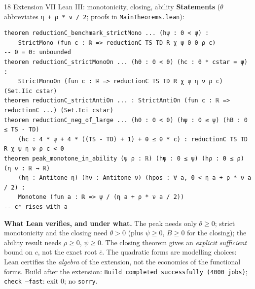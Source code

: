 \documentclass[aspectratio=169,11pt]{beamer}
\begin{document}
\begin{frame}[fragile]{18 \textperiodcentered{} Extension VII \textperiodcentered{} Lean III: monotonicity, closing, ability}
  \small\textbf{Statements} ($\theta$ abbreviates \texttt{η + ρ * ν / 2}; proofs in \texttt{MainTheorems.lean}):
\begin{lstlisting}
theorem reductionC_benchmark_strictMono ... (hψ : 0 < ψ) :
    StrictMono (fun c : ℝ => reductionC TS TD R χ ψ 0 0 ρ c)          -- θ = 0: unbounded
theorem reductionC_strictMonoOn ... (hθ : 0 < θ) (hc : θ * cstar = ψ) :
    StrictMonoOn (fun c : ℝ => reductionC TS TD R χ ψ η ν ρ c) (Set.Iic cstar)
theorem reductionC_strictAntiOn ... : StrictAntiOn (fun c : ℝ => reductionC ...) (Set.Ici cstar)
theorem reductionC_neg_of_large ... (hθ : 0 < θ) (hψ : 0 ≤ ψ) (hB : 0 ≤ TS - TD)
    (hc : 4 * ψ + 4 * ((TS - TD) + 1) + θ ≤ θ * c) : reductionC TS TD R χ ψ η ν ρ c < 0
theorem peak_monotone_in_ability (ψ ρ : ℝ) (hψ : 0 ≤ ψ) (hρ : 0 ≤ ρ) (η ν : ℝ → ℝ)
    (hη : Antitone η) (hν : Antitone ν) (hpos : ∀ a, 0 < η a + ρ * ν a / 2) :
    Monotone (fun a : ℝ => ψ / (η a + ρ * ν a / 2))                    -- c* rises with a
\end{lstlisting}
  \footnotesize
  \textbf{What Lean verifies, and under what.} The peak needs only $\theta\ge 0$; strict monotonicity and the
  closing need $\theta>0$ (plus $\psi\ge 0$, $B\ge 0$ for the closing); the ability result needs $\rho\ge 0$,
  $\psi\ge 0$. The closing theorem gives an \emph{explicit sufficient} bound on $c$, not the exact root
  $\bar c$. The quadratic forms are modelling choices: Lean certifies the \emph{algebra} of the extension, not
  the economics of the functional forms. Build after the extension: \texttt{Build completed successfully
  (4000 jobs)}; \texttt{check --fast}: exit 0; no \texttt{sorry}.
\end{frame}
\end{document}
